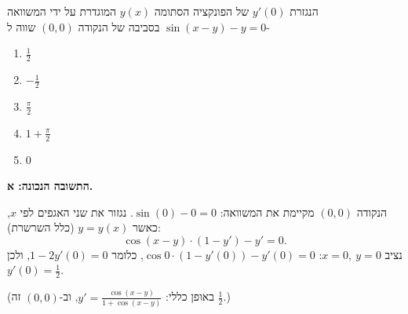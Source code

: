 
\begin{question}
הנגזרת $y'(0)$ של הפונקציה הסתומה $y(x)$ המוגדרת על ידי המשוואה $\sin(x-y)-y=0$ בסביבה של הנקודה $(0,0)$ שווה ל-
\begin{enumerate}
  \item $\frac12$
  \item $-\frac12$
  \item $\frac{\pi}{2}$
  \item $1+\frac{\pi}{2}$
  \item $0$
\end{enumerate}
\end{question}

\begin{solution}
\textbf{התשובה הנכונה: א.}

הנקודה $(0,0)$ מקיימת את המשוואה: $\sin(0)-0=0$. נגזור את שני האגפים לפי $x$, כאשר $y=y(x)$ (כלל השרשרת):
\[ \cos(x-y)\cdot(1-y')-y'=0 . \]
נציב $x=0,\ y=0$: $\cos 0\cdot(1-y'(0))-y'(0)=0$, כלומר $1-2y'(0)=0$, ולכן $y'(0)=\frac12$.

(באופן כללי: $y'=\frac{\cos(x-y)}{1+\cos(x-y)}$, וב-$(0,0)$ זה $\frac{1}{2}$.)
\end{solution}
